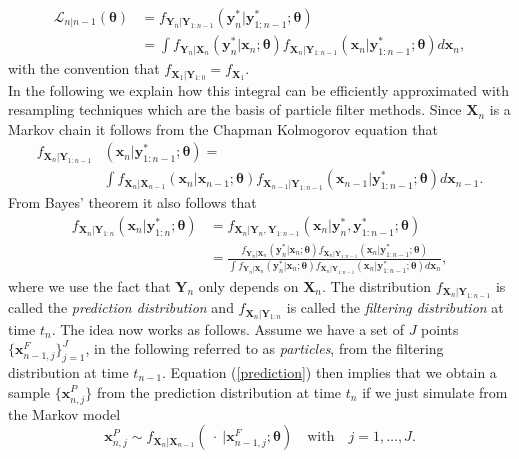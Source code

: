 \begin{align}
\mathcal{L}_{n|n-1}(\bm{\theta})&= f_{\bm{Y}_n|\bm{Y}_{1:n-1}}(\bm{y}^*_{n}|\bm{y}^*_{1:n-1};\bm{\theta}) \nonumber\\&= \int f_{\bm{Y}_n|\bm{X}_{n}}(\bm{y}^*_{n}|\bm{x}_n;\bm{\theta})f_{\bm{X}_n|\bm{Y}_{1:n-1}}(\bm{x}_{n}|\bm{y}^*_{1:n-1};\bm{\theta})d\bm{x}_n, \label{conlik} 
\end{align}
with the convention that $f_{\bm{X}_1|\bm{Y}_{1:0}}=f_{\bm{X}_1}$.\\
In the following we explain how this integral can be efficiently approximated with resampling techniques which are the basis of particle filter methods.
Since $\bm{X}_n$  is a  Markov chain it follows from the Chapman Kolmogorov equation that
\begin{align}
f_{\bm{X}_n|\bm{Y}_{1:n-1}}&(\bm{x}_{n}|\bm{y}^*_{1:n-1};\bm{\theta})= \label{prediction} \\ 
& \int f_{\bm{X}_n|\bm{X}_{n-1}}(\bm{x}_{n}|\bm{x}_{n-1};\bm{\theta})f_{\bm{X}_{n-1}|\bm{Y}_{1:n-1}}(\bm{x}_{n-1}|\bm{y}^*_{1:n-1};\bm{\theta})d\bm{x}_{n-1}\nonumber.
\end{align}
From Bayes' theorem it also follows that
\begin{align}
f_{\bm{X}_n|\bm{Y}_{1:n}}(\bm{x}_{n}|\bm{y}^*_{1:n};\bm{\theta})&=f_{\bm{X}_n|\bm{Y}_{n},\bm{Y}_{1:n-1}}(\bm{x}_{n}|\bm{y}^*_{n},\bm{y}^*_{1:n-1};\bm{\theta})\nonumber \\&=\frac{f_{\bm{Y}_n|\bm{X}_{n}}(\bm{y}^*_{n}|\bm{x}_{n};\bm{\theta})f_{\bm{X}_n|\bm{Y}_{1:n-1}}(\bm{x}_{n}|\bm{y}^*_{1:n-1};\bm{\theta})}{\int f_{\bm{Y}_n|\bm{X}_{n}}(\bm{y}^*_{n}|\bm{x}_{n};\bm{\theta})f_{\bm{X}_n|\bm{Y}_{1:n-1}}(\bm{x}_{n}|\bm{y}^*_{1:n-1};\bm{\theta}) d\bm{x}_n},\label{filtering}
\end{align}
where we use the fact that $\bm{Y}_n$ only depends on $\bm{X}_n$.
The distribution $f_{\bm{X}_{n}|\bm{Y}_{1:n-1}}$ is called the \textit{prediction distribution} and 
$f_{\bm{X}_{n}|\bm{Y}_{1:n}}$  is called the \textit{filtering distribution} at time $t_n$. The idea now works as follows. Assume we have a set of $J$ points
$\{\bm{x}^F_{n-1,j}\}_{j=1}^J $,  in the following referred to as \textit{particles},   from the filtering distribution at time $t_{n-1}$. Equation (\ref{prediction}) then implies that we obtain a sample $\{\bm{x}^P_{n,j}\}$ from the prediction distribution at time $t_n$  if we just simulate from  the Markov model    
\begin{equation}
\bm{x}^P_{n,j} \sim f_{\bm{X}_n|\bm{X}_{n-1}}(\ \cdot \ |\bm{x}^F_{n-1,j};\bm{\theta})\quad \text{with}\quad j=1,\dots , J.
\label{simulating}
\end{equation}
